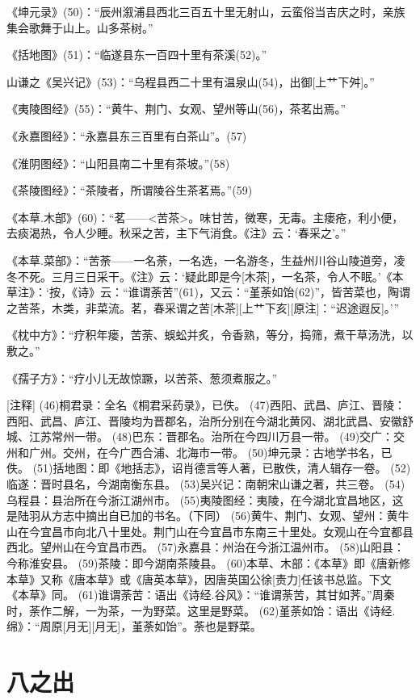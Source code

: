 \documentclass[12pt,UTF8]{ctexbook}
\begin{document}
《坤元录》(50)：“辰州溆浦县西北三百五十里无射山，云蛮俗当吉庆之时，亲族集会歌舞于山上。山多茶树。”

《括地图》(51)：“临遂县东一百四十里有茶溪(52)。”

山谦之《吴兴记》(53)：“乌程县西二十里有温泉山(54)，出御[上艹下舛]。”

《夷陵图经》(55)：“黄牛、荆门、女观、望州等山(56)，茶茗出焉。”

《永嘉图经》：“永嘉县东三百里有白茶山”。(57)

《淮阴图经》：“山阳县南二十里有茶坡。”(58)

《茶陵图经》：“茶陵者，所谓陵谷生茶茗焉。”(59)

《本草.木部》(60)：“茗——<苦茶>。味甘苦，微寒，无毒。主瘘疮，利小便，去痰渴热，令人少睡。秋采之苦，主下气消食。《注》云：‘春采之’。”

《本草.菜部》：“苦荼——一名荼，一名选，一名游冬，生益州川谷山陵道旁，凌冬不死。三月三日采干。《注》云：‘疑此即是今[木茶]，一名茶，令人不眠。’《本草注》：‘按，《诗》云：“谁谓荼苦”(61)，又云：“堇荼如饴(62)”，皆苦菜也，陶谓之苦茶，木类，非菜流。茗，春采谓之苦[木茶][上艹下亥][原注]：“迟途遐反]。’”

《枕中方》：“疗积年瘘，苦荼、蜈蚣并炙，令香熟，等分，捣筛，煮干草汤洗，以敷之。”

《孺子方》：“疗小儿无故惊蹶，以苦茶、葱须煮服之。”

[注释]
(46)桐君录：全名《桐君采药录》，已佚。
(47)西阳、武昌、庐江、晋陵：西阳、武昌、庐江、晋陵均为晋郡名，治所分别在今湖北黄冈、湖北武昌、安徽舒城、江苏常州一带。
(48)巴东：晋郡名。治所在今四川万县一带。
(49)交广：交州和广州。交州，在今广西合浦、北海市一带。
(50)坤元录：古地学书名，已佚。
(51)括地图：即《地括志》，诏肖德言等人著，已散佚，清人辑存一卷。
(52)临遂：晋时县名，今湖南衡东县。
(53)吴兴记：南朝宋山谦之著，共三卷。
(54)乌程县：县治所在今浙江湖州市。
(55)夷陵图经：夷陵，在今湖北宜昌地区，这是陆羽从方志中摘出自已加的书名。（下同）
(56)黄牛、荆门、女观、望州：黄牛山在今宜昌市向北八十里处。荆门山在今宜昌市东南三十里处。女观山在今宜都县西北。望州山在今宜昌市西。
(57)永嘉县：州治在今浙江温州市。
(58)山阳县：今称淮安县。
(59)茶陵：即今湖南茶陵县。
(60)本草、木部：《本草》即《唐新修本草》又称《唐本草》或《唐英本草》，因唐英国公徐[责力]任该书总监。下文《本草》同。
(61)谁谓荼苦：语出《诗经.谷风》：“谁谓荼苦，其甘如荠。”周秦时，荼作二解，一为茶，一为野菜。这里是野菜。
(62)堇荼如饴：语出《诗经.绵》：“周原[月无][月无]，堇荼如饴”。荼也是野菜。

\chapter{八之出}
\end{document}
